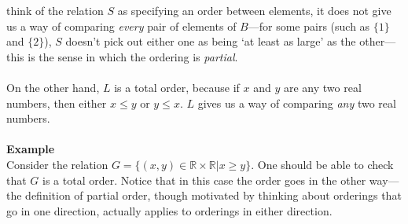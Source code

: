 \documentclass{report}
\theoremstyle{definition}
\begin{document}
think of the relation $S$ as specifying an order between elements, it does not give us a way of
comparing \textit{every} pair of elements of $B$---for some pairs (such as $\{1\}$ and $\{2\}$), $S$ doesn't pick out either one as being `at least as large' as the other---this is the sense in
which the ordering is \textit{partial}.\\
\vspace{1mm}\\
On the other hand, $L$ is a total order, because if $x$ and $y$ are any two real numbers, then either $x\leq y$ or $y\leq x$. $L$ gives us a way of comparing \textit{any} two real numbers.\\
\vspace{1mm}\\
\noindent\textbf{Example}\\
Consider the relation $G=\{(x,y)\in\mathbb R\times\mathbb R|x\geq y\}$. One should be able to check that $G$ is a total order. Notice that in this case the order goes in the other way---the
definition of partial order, though motivated by thinking about orderings that go in one direction, actually applies to orderings in either direction.
\newpage
\end{document}
